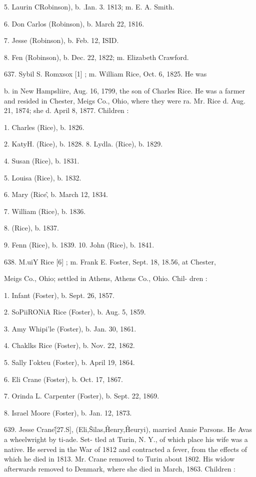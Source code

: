 \documentclass{book}
\begin{document}
5. Laurin CRobinson), b. .Ian. 3. 1813; m. E. A. Smith. 

6. Don Carlos (Robinson), b. March 22, 1816. 

7. Jesse (Robinson), b. Feb. 12, ISID. 

8. Fen (Robinson), b. Dec. 22, 1822; m. Elizabeth Crawford. 

637. Sybil S. Romxsox [1] ; m. William Rice, Oct. 6, 1825. He was 

b. in New Hampsliire, Aug. 16, 1799, the son of Charles Rice. 
He was a farmer and resided in Chester, Meigs Co., Ohio, 
where they were ra. Mr. Rice d. Aug. 21, 1874; she d. April 
8, 1877. Children : 

1. Charles (Rice), b. 1826. 

2. KatyH. (Rice), b. 1828. 
8. Lydla. (Rice), b. 1829. 

4. Susan (Rice), b. 1831. 

5. Louisa (Rice), b. 1832. 

6. Mary (Rice\^, b. March 12, 1834. 

7. William (Rice), b. 1836. 

8. (Rice), b. 1837. 

9. Fenn (Rice), b. 1839. 
10. John (Rice), b. 1841. 

638. M.uiY Rice [6] ; m. Frank E. Foster, Sept. 18, 18.56, at Chester, 

Meigs Co., Ohio; settled in Athens, Athens Co., Ohio. Chil- 
dren : 

1. Infant (Foster), b. Sept. 26, 1857. 

2. SoPiiRONiA Rice (Foster), b. Aug. 5, 1859. 

3. Amy Whipi'le (Foster), b. Jan. 30, 1861. 

4. Chaklks Rice (Foster), b. Nov. 22, 1862. 

5. Sally I'okteu (Foster), b. April 19, 1864. 

6. Eli Crane (Foster), b. Oct. 17, 1867. 

7. Orinda L. Carpenter (Foster), b. Sept. 22, 1869. 

8. Israel Moore (Foster), b. Jan. 12, 1873. 

639. Jesse Crane\^ [27.S], (Eli,\^ Silas,\^ Henry,\^ Heuryi), 
married Annie Parsons. He Avas a wheelwright by ti-ade. Set- 
tled at Turin, N. Y., of which place his wife was a native. He 
served in the War of 1812 and contracted a fever, from the 
effects of which he died in 1813. Mr. Crane removed to Turin 
about 1802. His widow afterwards removed to Denmark, where 
she died in March, 1863. Children : 
\end{document}

